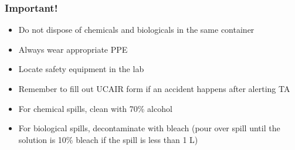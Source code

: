 \documentclass[letterpaper, 12pt]{article}
\begin{document}
\subsubsection*{Important!}

\begin{itemize}
\item Do not dispose of chemicals and biologicals in the same container
\item Always wear appropriate PPE
\item Locate safety equipment in the lab
\item Remember to fill out UCAIR form if an accident happens after alerting TA
\item For chemical spills, clean with 70\% alcohol
\item For biological spills, decontaminate with bleach (pour over spill until the solution is 10\% bleach if the spill is less than 1 L)
\end{itemize}
\end{document}
